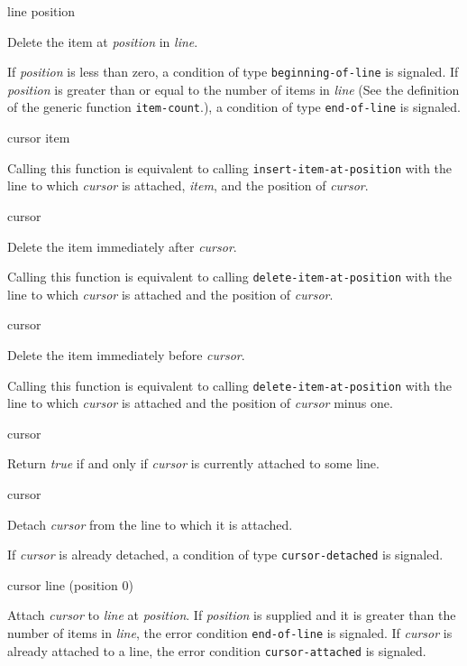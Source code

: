  {line position}

Delete the item at \textit{position} in \textit{line}.

If \textit{position} is less than zero, a condition of type
\texttt{beginning-of-line} is signaled.  If \textit{position} is
greater than or equal to the number of items in \textit{line} (See the
definition of the generic function \texttt{item-count}.), a condition
of type \texttt{end-of-line} is signaled.

 {cursor item}

Calling this function is equivalent to calling
\texttt{insert-item-at-position} with the line to which
\textit{cursor} is attached, \textit{item}, and the position of
\textit{cursor}.  \howeverperformance{}

\ifdetached{}

 {cursor}

Delete the item immediately after \emph{cursor}.

Calling this function is equivalent to calling
\texttt{delete-item-at-position} with the line to which
\textit{cursor} is attached and the position of \textit{cursor}.
\howeverperformance{}

\ifdetached{}

 {cursor}

Delete the item immediately before \emph{cursor}.

Calling this function is equivalent to calling
\texttt{delete-item-at-position} with the line to which
\textit{cursor} is attached and the position of \textit{cursor} minus
one.  \howeverperformance{}

\ifdetached{}

 {cursor}

Return \emph{true} if and only if \textit{cursor} is currently
attached to some line.

 {cursor}

Detach \textit{cursor} from the line to which it is attached.

If \textit{cursor} is already detached, a condition of type
\texttt{cursor-detached} is signaled.

 {cursor line \optional (position 0)}

Attach \textit{cursor} to \textit{line} at \textit{position}.  If
\textit{position} is supplied and it is greater than the number of
items in \textit{line}, the error condition \texttt{end-of-line} is
signaled.  If \textit{cursor} is already attached to a line, the error
condition \texttt{cursor-attached} is signaled.

